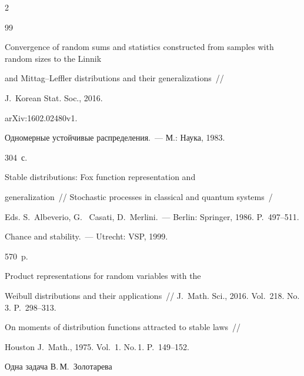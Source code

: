 \begin{multicols}{2}
{{\begin{thebibliography}{99}


Convergence of random sums and statistics constructed from samples with random sizes to the Linnik 


and Mittag--Leffler distributions and their generalizations~// 


J.~Korean Stat. Soc., 2016.  


arXiv:1602.02480v1.







 Одномерные устойчивые распределения.~--- М.: Наука, 1983.


304~с.







 Stable distributions: Fox function representation and 


generalization~// Stochastic processes in classical and quantum systems~/ 


Eds. S.~Albeverio, G.~ Casati, D.~Merlini.~--- Berlin: Springer, 1986. P.~497--511.







 Chance and stability.~--- Utrecht: VSP, 1999.


570~p.







 Product representations for random variables with the


 Weibull distributions and their applications~// J.~Math. Sci., 2016. Vol.~218. No.\,3. P.~298--313.







 On moments of distribution functions attracted to stable laws~// 


Houston J.~Math., 1975. Vol.~1. No.\,1. P.~149--152.







 Одна задача В.\,М.~Золотарева 



\end{thebibliography}}}
\end{multicols}
